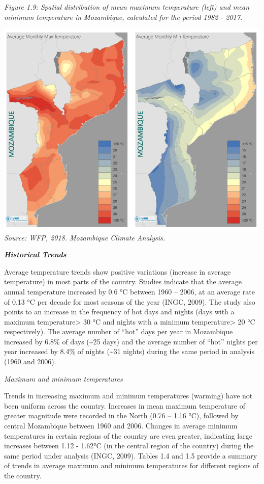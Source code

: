 \documentclass[
]{book}
\begin{document}
\emph{Figure 1.9: Spatial distribution of mean maximum temperature (left) and mean minimum temperature in Mozambique, calculated for the period 1982 - 2017.}

\includegraphics{Temperature-average.png}
\emph{Source: WFP, 2018. Mozambique Climate Analysis.}

\textbf{\emph{Historical Trends}}

Average temperature trends show positive variations (increase in average temperature) in most parts of the country. Studies indicate that the average annual temperature increased by 0.6 °C between 1960 -- 2006, at an average rate of 0.13 °C per decade for most seasons of the year (INGC, 2009). The study also points to an increase in the frequency of hot days and nights (days with a maximum temperature\textgreater{} 30 °C and nights with a minimum temperature\textgreater{} 20 °C respectively). The average number of ``hot'' days per year in Mozambique increased by 6.8\% of days (\textasciitilde25 days) and the average number of ``hot'' nights per year increased by 8.4\% of nights (\textasciitilde31 nights) during the same period in analysis (1960 and 2006).

\emph{Maximum and minimum temperatures}

Trends in increasing maximum and minimum temperatures (warming) have not been uniform across the country. Increases in mean maximum temperature of greater magnitude were recorded in the North (0.76 -- 1.16 °C), followed by central Mozambique between 1960 and 2006. Changes in average minimum temperatures in certain regions of the country are even greater, indicating large increases between 1.12 - 1.62°C (in the central region of the country) during the same period under analysis (INGC, 2009). Tables 1.4 and 1.5 provide a summary of trends in average maximum and minimum temperatures for different regions of the country.
\end{document}
